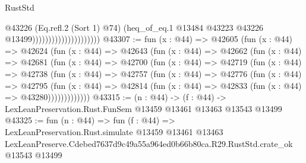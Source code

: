 \begin{lexlean}{RustStd}
\begin{coremodule}
                                            @43226
                                            (Eq.refl.{2} (Sort 1) @74)
                                            (heq_of_eq.{1}
                                              @13484
                                              @43223
                                              @43226
                                              @13499)))))))))))))))))))))
@43307 := fun (x : @44) =>
  @42605
    (fun (x : @44) =>
    @42624
      (fun (x : @44) =>
      @42643
        (fun (x : @44) =>
        @42662
          (fun (x : @44) =>
          @42681
            (fun (x : @44) =>
            @42700
              (fun (x : @44) =>
              @42719
                (fun (x : @44) =>
                @42738
                  (fun (x : @44) =>
                  @42757
                    (fun (x : @44) =>
                    @42776
                      (fun (x : @44) =>
                      @42795
                        (fun (x : @44) =>
                        @42814 (fun (x : @44) => @42833 (fun (x : @44) => @43280)))))))))))))
@43315 := (n : @44) ->
  (f : @44) -> LexLeanPreservation.Rust.FunSem @13459 @13461 @13463 @13543 @13499
@43325 := fun (n : @44) =>
  fun (f : @44) =>
  LexLeanPreservation.Rust.simulate
    @13459
    @13461
    @13463
    LexLeanPreserve.Cdebed7637d9c49a55a964ed0b66b80ca.R29.RustStd.crate_ok
    @13543
    @13499
\end{coremodule}
\end{lexlean}
